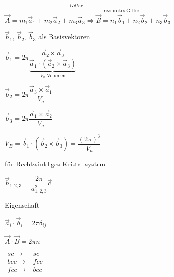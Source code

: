 $\overset{Gitter}{\vec{A}=m_{1}\vec{a}_{1}+m_{2}\vec{a}_{2}+m_{3}\vec{a}_{3}\Rightarrow\overset{\text{reziprokes Gitter}}{\vec{B}=n_{1}\vec{b}_{1}+n_{2}\vec{b}_{2}}}+n_{3}\vec{b}_{3}$

$\vec{b}_{1},\,\vec{b}_{2},\,\vec{b}_{3}$ als Basisvektoren 

$\vec{b}_{1}=2\pi\dfrac{\vec{a}_{2}\times\vec{a}_{3}}{\underbrace{\vec{a}_{1}\cdot\left(\vec{a}_{2}\times\vec{a}_{3}\right)}_{V_{a}\text{ Volumen}}}$

$\vec{b}_{2}=2\pi\dfrac{\vec{a}_{3}\times\vec{a}_{1}}{V_{a}}$

$\vec{b}_{3}=2\pi\dfrac{\vec{a}_{1}\times\vec{a}_{2}}{V_{a}}$ 

$V_{B}=\vec{b}_{1}\cdot\left(\vec{b}_{2}\times\vec{b}_{3}\right)=\dfrac{\left(2\pi\right)^{3}}{V_{a}}$

für Rechtwinkliges Kristallsystem

$\vec{b}_{1,2,3}=\dfrac{2\pi}{a_{1,2,3}^{2}}\vec{a}$

Eigenschaft

$\vec{a}_{i}\cdot\vec{b}_{i}=2\pi\delta_{ij}$

$\vec{A}\cdot\vec{B}=2\pi n$ 

$\begin{array}{cc}
sc\rightarrow & sc\\
bcc\rightarrow & fcc\\
fcc\rightarrow & bcc\end{array}$
